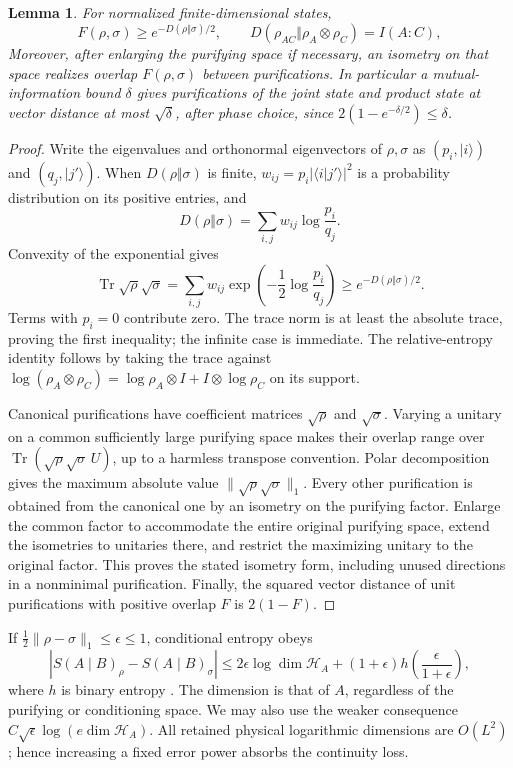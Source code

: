 \documentclass[11pt]{article}
\numberwithin{equation}{section}
\newtheorem{lemma}[theorem]{Lemma}
\theoremstyle{definition}
\theoremstyle{remark}
\DeclareMathOperator{\Tr}{Tr}
\newcommand{\norm}[1]{\lVert #1\rVert}
\begin{document}
\begin{lemma}\label{lem:fidelity}
For normalized finite-dimensional states,
\begin{equation}\label{eq:fidelity-information}
 F(\rho,\sigma)\ge e^{-D(\rho\Vert\sigma)/2},
 \qquad
 D(\rho_{AC}\Vert\rho_A\otimes\rho_C)=I(A:C),
\end{equation}
Moreover, after enlarging the
purifying space if necessary, an isometry on that space realizes overlap
$F(\rho,\sigma)$ between purifications. In particular a
mutual-information bound $\delta$ gives purifications of the joint state
and product state at vector distance at most $\sqrt\delta$, after phase
choice, since $2(1-e^{-\delta/2})\le\delta$.
\end{lemma}
\begin{proof}
Write the eigenvalues and orthonormal eigenvectors of $\rho,\sigma$ as
$(p_i,|i\rangle)$ and $(q_j,|j'\rangle)$. When $D(\rho\Vert\sigma)$ is
finite, $w_{ij}=p_i|\langle i|j'\rangle|^2$ is a probability distribution
on its positive entries, and
\[
 D(\rho\Vert\sigma)=\sum_{i,j}w_{ij}\log\frac{p_i}{q_j}.
\]
Convexity of the exponential gives
\[
 \Tr\sqrt\rho\sqrt\sigma
 =\sum_{i,j}w_{ij}\exp\!\left(-\frac12\log\frac{p_i}{q_j}\right)
 \ge e^{-D(\rho\Vert\sigma)/2}.
\]
Terms with $p_i=0$ contribute zero. The trace norm is at least the
absolute trace, proving the first inequality; the infinite case is
immediate. The relative-entropy identity follows by taking the trace
against $\log(\rho_A\otimes\rho_C)
=\log\rho_A\otimes I+I\otimes\log\rho_C$ on its support.

Canonical purifications have coefficient matrices $\sqrt\rho$ and
$\sqrt\sigma$. Varying a unitary on a common sufficiently large
purifying space makes their overlap range over
$\Tr(\sqrt\rho\sqrt\sigma\,U)$, up to a harmless transpose convention.
Polar decomposition gives the maximum absolute value
$\norm{\sqrt\rho\sqrt\sigma}_1$. Every other purification is obtained
from the canonical one by an isometry on the purifying factor. Enlarge
the common factor to accommodate the entire original purifying space,
extend the isometries to unitaries there, and restrict the maximizing
unitary to the original factor. This proves the stated isometry form,
including unused directions in a nonminimal purification. Finally,
the squared vector distance of unit purifications with positive overlap
$F$ is $2(1-F)$.
\end{proof}

If $\frac12\norm{\rho-\sigma}_1\le\epsilon\le1$, conditional entropy
obeys
\begin{equation}\label{eq:entropy-continuity}
 |S(A\mid B)_\rho-S(A\mid B)_\sigma|
 \le2\epsilon\log\dim\mathcal H_A
 +(1+\epsilon)h\!\left(\frac{\epsilon}{1+\epsilon}\right),
\end{equation}
where $h$ is binary entropy \cite[Lemma~2]{Winter2016}. The dimension is
that of $A$, regardless of the purifying or conditioning space. We may
also use the weaker consequence $C\sqrt\epsilon\log(e\dim\mathcal H_A)$.
All retained physical logarithmic dimensions are $O(L^2)$; hence increasing
a fixed error power absorbs the continuity loss.
\end{document}
